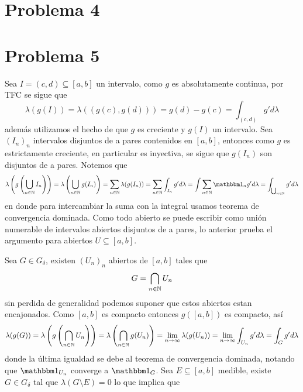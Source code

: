 \documentclass{article}
\begin{document}
\section*{Problema 4}

\section*{Problema 5}
\noindent Sea $I=(c,d)\subseteq[a,b]$ un intervalo, como $g$ es absolutamente continua, por TFC 
se sigue que
\begin{equation*}
    \lambda(g(I))=\lambda((g(c),g(d)))=g(d)-g(c)=\int_{(c,d)}g'd\lambda
\end{equation*}
además utilizamos el hecho de que $g$ es creciente y $g(I)$ un intervalo.
Sea $(I_{n})_{n}$ intervalos disjuntos de a pares contenidos en $[a,b]$, entonces como $g$ es 
estrictamente creciente, en particular es inyectiva, se sigue que $g(I_{n})$ son disjuntos de a 
pares. Notemos que
\begin{equation*}
    \lambda\left(g\left(\bigcup_{n\in\N}I_{n}\right)\right)
    =\lambda\left(\bigcup_{n\in\N}g(I_{n})\right)=\sum_{n\in\N}\lambda(g(I_{n}))
    =\sum_{n\in\N}\int_{I_{n}}g'd\lambda=\int\sum_{n\in\N}\I_{n}g'd\lambda
    =\int_{\bigcup_{n\in\N}}g'd\lambda
\end{equation*}
en donde para intercambiar la suma con la integral usamos teorema de convergencia dominada. Como
todo abierto se puede escribir como unión numerable de intervalos abiertos disjuntos de a pares,
lo anterior prueba el argumento para abiertos $U\subseteq[a,b]$.

\vspace{2mm}
\noindent Sea $G\in G_{\delta}$, existen $(U_{n})_{n}$ abiertos de $[a,b]$ tales que
\begin{equation*}
    G=\bigcap_{n\in\mathbb{N}}U_{n}
\end{equation*}
sin perdida de generalidad podemos suponer que estos abiertos estan encajonados. Como $[a,b]$ es
compacto entonces $g([a,b])$ es compacto, así
\begin{equation*}
    \lambda(g(G))=\lambda\left(g\left(\bigcap_{n\in\mathbb{N}}U_{n}\right)\right)
    =\lambda\left(\bigcap_{n\in\mathbb{N}}g(U_{n})\right)=\lim\limits_{n\to\infty}\lambda(g(U_{n}))
    =\lim\limits_{n\to\infty}\int_{U_{n}}g'd\lambda=\int_{G}g'd\lambda
\end{equation*}
donde la última igualdad se debe al teorema de convergencia dominada, notando que $\I_{U_{n}}$ 
converge a $\I_{G}$. Sea $E\subseteq[a,b]$ medible, existe $G\in G_{\delta}$ tal que 
$\lambda(G\setminus E)=0$ lo que implica que 


\end{document}
